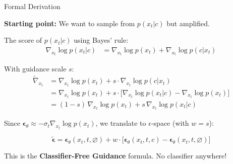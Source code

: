 \documentclass[aspectratio=169, 11pt]{beamer}
\begin{document}
\begin{frame}{Formal Derivation}

\textbf{Starting point:} We want to sample from $p(x_t|c)$ but amplified.

\medskip
The score of $p(x_t|c)$ using Bayes' rule:
\begin{align}
    \nabla_{x_t}\log p(x_t|c)
    &= \nabla_{x_t}\log p(x_t) + \nabla_{x_t}\log p(c|x_t) \nonumber
\end{align}

With guidance scale $s$:
\begin{align}
    \tilde{\nabla}_{x_t}
    &= \nabla_{x_t}\log p(x_t) + s \cdot \nabla_{x_t}\log p(c|x_t) \nonumber \\
    &= \nabla_{x_t}\log p(x_t) + s \cdot \big[\nabla_{x_t}\log p(x_t|c) - \nabla_{x_t}\log p(x_t)\big] \nonumber \\
    &= (1-s)\,\nabla_{x_t}\log p(x_t) + s\,\nabla_{x_t}\log p(x_t|c) \nonumber
\end{align}

Since $\boldsymbol{\epsilon}_\theta \approx -\sigma_t \nabla_{x_t}\log p(x_t)$, we translate to $\epsilon$-space (with $w = s$):

\[
\boxed{
    \tilde{\boldsymbol{\epsilon}} = \boldsymbol{\epsilon}_\theta(x_t,t,\varnothing) + w\cdot\big[\boldsymbol{\epsilon}_\theta(x_t,t,c) - \boldsymbol{\epsilon}_\theta(x_t,t,\varnothing)\big]
}
\]

This is the \textbf{Classifier-Free Guidance} formula. No classifier anywhere!

\end{frame}
\end{document}
